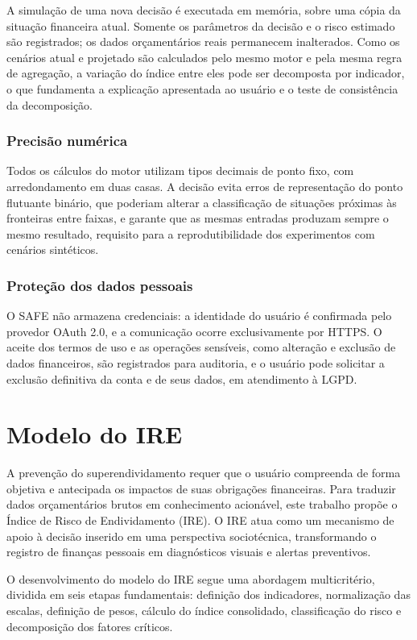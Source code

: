 \documentclass[portuguese]{sbc2025}%
\begin{document}
A simulação de uma nova decisão é executada em memória, sobre uma cópia da situação financeira atual. Somente os parâmetros da decisão e o risco estimado são registrados; os dados orçamentários reais permanecem inalterados. Como os cenários atual e projetado são calculados pelo mesmo motor e pela mesma regra de agregação, a variação do índice entre eles pode ser decomposta por indicador, o que fundamenta a explicação apresentada ao usuário e o teste de consistência da decomposição.

\subsubsection{Precisão numérica}

Todos os cálculos do motor utilizam tipos decimais de ponto fixo, com arredondamento em duas casas. A decisão evita erros de representação do ponto flutuante binário, que poderiam alterar a classificação de situações próximas às fronteiras entre faixas, e garante que as mesmas entradas produzam sempre o mesmo resultado, requisito para a reprodutibilidade dos experimentos com cenários sintéticos.

\subsubsection{Proteção dos dados pessoais}

O SAFE não armazena credenciais: a identidade do usuário é confirmada pelo provedor OAuth 2.0, e a comunicação ocorre exclusivamente por HTTPS. O aceite dos termos de uso e as operações sensíveis, como alteração e exclusão de dados financeiros, são registrados para auditoria, e o usuário pode solicitar a exclusão definitiva da conta e de seus dados, em atendimento à LGPD.


\section{Modelo do IRE}

A prevenção do superendividamento requer que o usuário compreenda de forma objetiva e antecipada os impactos de suas obrigações financeiras. Para traduzir dados orçamentários brutos em conhecimento acionável, este trabalho propõe o Índice de Risco de Endividamento (IRE). O IRE atua como um mecanismo de apoio à decisão inserido em uma perspectiva sociotécnica, transformando o registro de finanças pessoais em diagnósticos visuais e alertas preventivos.

O desenvolvimento do modelo do IRE segue uma abordagem multicritério, dividida em seis etapas fundamentais: definição dos indicadores, normalização das escalas, definição de pesos, cálculo do índice consolidado, classificação do risco e decomposição dos fatores críticos.
\end{document}

